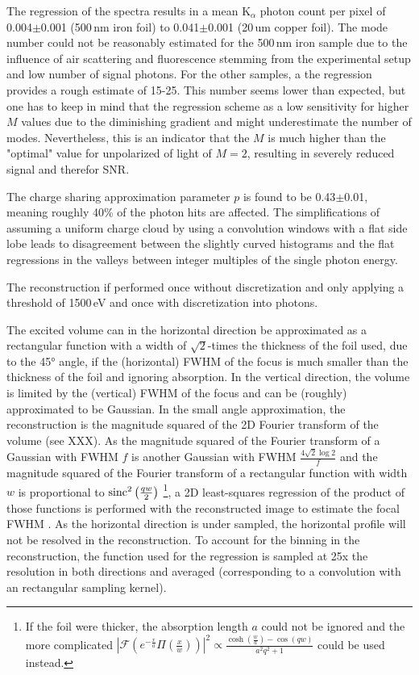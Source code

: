 The regression of the spectra results in a mean K$_{\alpha}$ photon count per pixel of 0.004$\pm$0.001 (500\,nm iron foil) to 0.041$\pm$0.001 (20\,um copper foil). The mode number could not be reasonably estimated for the 500\,nm iron sample due to the influence of air scattering and fluorescence stemming from the experimental setup and low number of signal photons. For the other samples, a the regression provides a rough estimate of 15-25. This number seems lower than expected, but one has to keep in mind that the regression scheme as a low sensitivity for higher $M$ values due to the diminishing gradient and might underestimate the number of modes. Nevertheless, this is an indicator that the $M$ is much higher than the "optimal" value for unpolarized of light of $M=2$, resulting in severely reduced signal and therefor SNR.

The charge sharing approximation parameter $p$ is found to be 0.43$\pm$0.01, meaning roughly 40\% of the photon hits are affected. The simplifications of assuming a uniform charge cloud by using a convolution windows with a flat side lobe leads to disagreement between the slightly curved histograms and the flat regressions in the valleys between integer multiples of the single photon energy.

The reconstruction if performed once without discretization and only applying a threshold of 1500\,eV and once with discretization into photons. 




The excited volume can in the horizontal direction be approximated as a rectangular function with a width of $\sqrt{2}$-times the thickness of the foil used, due to the 45° angle, if the (horizontal) FWHM of the focus is much smaller than the thickness of the foil and ignoring absorption.  In the vertical direction, the volume is limited by the (vertical) FWHM of the focus and can be (roughly) approximated to be Gaussian. 
In the small angle approximation, the reconstruction is the magnitude squared of the 2D Fourier transform of the volume (see XXX). As the magnitude squared of the Fourier transform of a Gaussian with FWHM $f$ is another Gaussian with FWHM $\frac{4\sqrt{2}\log{2}}{f}$ and the magnitude squared of the Fourier transform of a rectangular function with width $w$ is proportional to $\operatorname{sinc}^2{\left(\frac{q w}{2}\right)}$
\footnote{If the foil were thicker, the absorption length $a$ could not be ignored and the more complicated $\left|\mathscr{F}\left(e^{-\frac{x}{a}} \Pi \left(\frac{x}{w}\right)\right)\right|^2 \propto \frac{\cosh \left(\frac{w}{a}\right)-\cos (q w)}{a^2 q^2+1}$
 could be used instead.}, a 2D least-squares regression of the product of those functions is performed with the reconstructed image to estimate the focal FWHM \cite{butz2015}. As the horizontal direction is under sampled, the horizontal profile will not be resolved in the reconstruction. To account for the binning in the reconstruction, the function used for the regression is sampled at 25x the resolution in both directions and averaged (corresponding to a convolution with an rectangular sampling kernel). 
